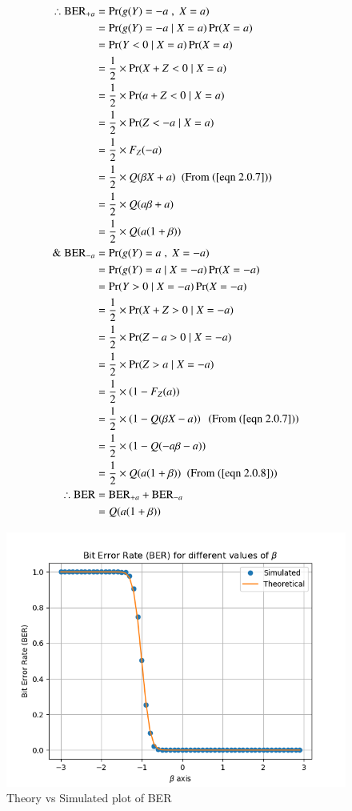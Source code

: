 \documentclass[journal,10pt,twocolumn]{IEEEtran}
\begin{document}
\begin{align}
\therefore \text{BER}_{+a} &= \Pr(g(Y) = -a \;,\; X = a)\\
&= \Pr(g(Y) = -a \;|\; X = a) \Pr(X=a)\\
&= \Pr(Y < 0 \;|\; X = a) \Pr(X=a)\\
&= \dfrac{1}{2} \times \Pr(X+Z < 0 \;|\; X = a) \\
&= \dfrac{1}{2} \times \Pr(a+Z < 0 \;|\; X = a) \\
&= \dfrac{1}{2} \times \Pr(Z < -a \;|\; X = a) \\
&= \dfrac{1}{2} \times F_Z(-a)\\
&= \dfrac{1}{2} \times Q(\beta X + a) \; \text{ (From (\ref{eqn 2.0.7}))}\\
&= \dfrac{1}{2} \times Q(a \beta + a)\\
&= \dfrac{1}{2} \times Q(a(1+\beta))\\
\& \; \text{BER}_{-a} &= \Pr(g(Y) = a \;,\; X = -a)\\
&= \Pr(g(Y) = a \;|\; X = -a) \Pr(X=-a)\\
&= \Pr(Y > 0 \;|\; X = -a) \Pr(X=-a)\\
&= \dfrac{1}{2} \times \Pr(X+Z > 0 \;|\; X = -a) \\
&= \dfrac{1}{2} \times \Pr(Z-a > 0 \;|\; X = -a) \\
&= \dfrac{1}{2} \times \Pr(Z > a \;|\; X = -a) \\
&= \dfrac{1}{2} \times \left( 1 - F_Z(a) \right) \\
&= \dfrac{1}{2} \times \left( 1 - Q(\beta X -a) \right) \; \text{ (From (\ref{eqn 2.0.7}))}\\
&= \dfrac{1}{2} \times \left( 1 - Q(-a \beta -a) \right) \\
&= \dfrac{1}{2} \times Q(a(1+\beta)) \; \text{ (From (\ref{eqn 2.0.8}))}\\
\therefore \text{BER} &= \text{BER}_{+a} + \text{BER}_{-a}\\
&= Q(a(1+\beta))
\end{align} 
\clearpage
\begin{figure}[!hbt]
    \centering
	\includegraphics[width=\columnwidth]{./Figures/Figure_1.png}
    \caption{Theory vs Simulated plot of BER}
    \label{CDF_Y}
\end{figure}
\end{document}
